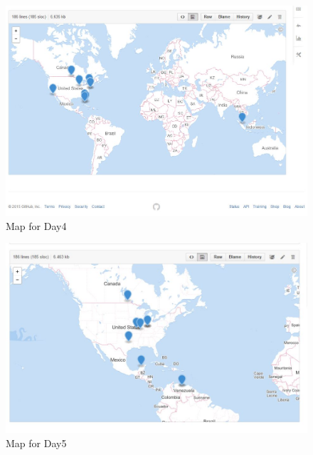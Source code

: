 \begin{figure}[ht]
	\begin{center}
		 \includegraphics[scale=0.60]{geo4}
		  \caption{Map for Day4}
	 \end{center}
\end{figure}
\begin{figure}[ht]
	\begin{center}
		 \includegraphics[scale=0.60]{geo5}
		  \caption{Map for Day5}
	 \end{center}
\end{figure}

\newpage
